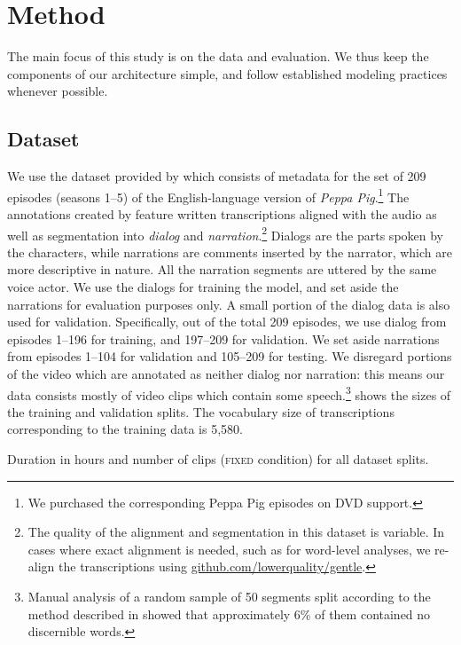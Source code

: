 \section{Method}
\label{sec:method}

The main focus of this study is on the data and evaluation. We thus
keep the components of our architecture simple, and follow established
modeling practices whenever possible.

\subsection{Dataset}
We use the dataset provided by \citet{papasarantopoulos2021narration}
which consists of metadata for the set of 209 episodes (seasons 1--5) of the
English-language version of {\it Peppa Pig}.\footnote{We purchased the
corresponding Peppa Pig episodes on DVD support.}
%
The annotations created by \citet{papasarantopoulos2021narration}
feature written transcriptions aligned with the audio as well as
segmentation into {\it dialog} and {\it narration}.\footnote{The
  quality of the alignment and segmentation in this dataset is
  variable. In cases where exact alignment is needed, such as for
  word-level analyses, we re-align the transcriptions using
  \url{github.com/lowerquality/gentle}.}  Dialogs are the parts spoken
by the characters, while narrations are comments inserted by the
narrator, which are more descriptive in nature. All the narration
segments are uttered by the same voice actor. We use the dialogs for
training the model, and set aside the narrations for evaluation
purposes only. A small portion of the dialog data is also used for
validation.  Specifically, out of the total 209 episodes, we use
dialog from episodes 1--196 for training, and 197--209 for
validation. We set aside narrations from episodes 1--104 for
validation and 105--209 for testing. We disregard portions of the
video which are annotated as neither dialog nor narration: this means
our data consists mostly of video clips which contain some
speech.\footnote{Manual analysis of a random sample of 50 segments
  split according to the method described in 
  showed that approximately 6\% of them contained no discernible words.}
 shows the sizes of the training and validation
splits. The vocabulary size of transcriptions corresponding to the
training data is 5,580.

\begin{table}[htb]
  \centering 
  \caption{Duration in hours and number of clips (\textsc{fixed} condition) for 
  all dataset splits.}
  \label{tab:ds-stat}
\end{table}


